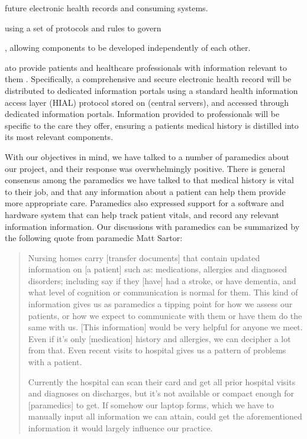 future electronic health records and consuming systems.

 using a set of protocols and rules to govern


, allowing components to be developed independently of each other.


ato provide patients and healthcare professionals with information relevant to them \cite{b1}. Specifically, a comprehensive and secure electronic health record will be distributed to dedicated information portals using a standard health information access layer (HIAL) protocol  stored on (central servers), and accessed through dedicated information portals. Information provided to professionals will be specific to the care they offer, ensuring a patients medical history is distilled into its most relevant components.


With our objectives in mind, we have talked to a number of paramedics about our project, and their response was overwhelmingly positive. There is general consensus among the paramedics we have talked to that medical history is vital to their job, and that any information about a patient can help them provide more appropriate care. Paramedics also expressed support for a software and hardware system that can help track patient vitals, and record any relevant information information. Our discussions with paramedics can be summarized by the following quote from paramedic Matt Sartor:

\blockquote{Nursing homes carry [transfer documents] that contain updated information on [a patient] such as: medications, allergies and diagnosed disorders; including say if they [have] had a stroke, or have dementia, and what level of cognition or communication is normal for them. This kind of information gives us as paramedics a tipping point for how we assess our patients, or how we expect to communicate with them or have them do the same with us. [This information] would be very helpful for anyone we meet. Even if it's only [medication] history and allergies, we can decipher a lot from that. Even recent visits to hospital gives us a pattern of problems with a patient.

Currently the hospital can scan their card and get all prior hospital visits and diagnoses on discharges, but it's not available or compact enough for [paramedics] to get. If somehow our laptop forms, which we have to manually input all information we can attain, could get the aforementioned information it would largely influence our practice.
}



